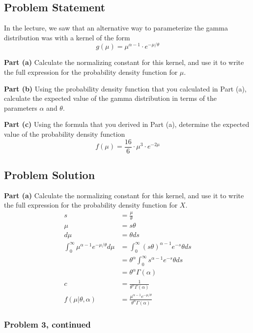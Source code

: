 \documentclass[12pt]{article}
\theoremstyle{definition}
\begin{document}
\subsection*{Problem Statement}

In the lecture, we saw that an alternative way to parameterize the gamma distribution was with a kernel of the form
$$
g(\mu) = \mu^{\alpha - 1} \cdot e^{-\mu/\theta}
$$

\bigskip
\noindent
{\bf Part (a)} Calculate the normalizing constant for this kernel, and use it to write the full expression for the probability density function for $\mu$.

\bigskip
\noindent
{\bf Part (b)} Using the probability density function that you calculated in Part (a), calculate the expected value of the gamma distribution in terms of the parameters $\alpha$ and $\theta$.

\bigskip
\noindent
{\bf Part (c)} Using the formula that you derived in Part (a), determine the expected value of the probability density function
$$
f(\mu) = \frac{16}{6} \cdot \mu^3 \cdot e^{-2\mu}
$$


\subsection*{Problem Solution}

\noindent
{\bf Part (a)} Calculate the normalizing constant for this kernel, and use it to write the full expression for the probability density function for $X$.
\begin{align*}
s &= \frac{\mu}{\theta}\\
\mu &= s\theta\\
d\mu &= \theta ds\\
\int_0^\infty \mu^{\alpha - 1} e^{-\mu/\theta}d\mu &= \int_0^\infty (s\theta)^{\alpha - 1} e^{-s}\theta ds\\
&= \theta^\alpha \int_0^\infty s^{\alpha - 1} e^{-s}\theta ds\\
&= \theta^\alpha\Gamma(\alpha)\\
c &= \frac{1}{\theta^\alpha\Gamma(\alpha)}\\
f(\mu|\theta, \alpha) &= \frac{\mu^{\alpha - 1} e^{-\mu/\theta}}{\theta^\alpha\Gamma(\alpha)} 
\end{align*}

\newpage
\subsubsection*{Problem 3, continued}
\end{document}
